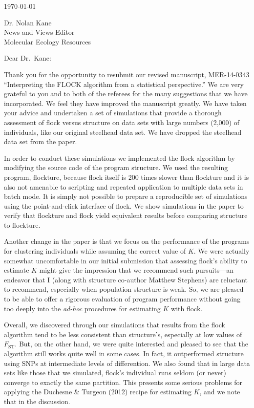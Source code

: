 \documentclass[11pt]{letter}
\date{}
\begin{document}
\begin{letter}{ \today 

Dr. Nolan Kane\\
News and Views Editor\\
Molecular Ecology Resources \\
}

\opening{Dear Dr.~Kane:}

Thank you for the opportunity to resubmit our revised manuscript, MER-14-0343 ``Interpreting the FLOCK algorithm
from a statistical perspective.''  We are very grateful to you and to both of the referees for the many
suggestions that we have incorporated.  We feel they have improved the manuscript greatly.  We have taken your
advice and undertaken a set of simulations that provide a thorough assessment of {\sc flock} versus {\sc 
structure} on data sets with large numbers (2,000) of individuals, like our original steelhead data set.
We have dropped the steelhead data set from the paper.  

In order to conduct these simulations we implemented the {\sc flock} algorithm by modifying the source code of
the program {\sc structure}.  We used the resulting program, {\sc flockture}, because {\sc flock} itself
is 200 times slower than {\sc flockture} and it is also not amenable to scripting and repeated application to 
multiple data sets in batch mode.  It is simply not possible to prepare a reproducible set of simulations using
the point-and-click interface of {\sc flock}.  We show simulations in the paper to verify that {\sc flockture} and {\sc flock} yield equivalent results before comparing {\sc structure} to {\sc flockture}.

Another change in the paper is that we focus on the performance of the programs for clustering individuals while
assuming the correct value of $K$.  We were actually somewhat uncomfortable in our initial submission that
assessing {\sc flock}'s ability to estimate $K$ might give the impression that we recommend such pursuits---an
endeavor that I (along with {\sc structure} co-author Matthew Stephens) are reluctant to recommend, especially
when population structure is weak.  So, we are pleased to be able to offer a rigorous evaluation of program
performance without going too deeply into the {\em ad-hoc} procedures for estimating $K$ with {\sc flock}.

Overall, we discovered through our simulations that results from the {\sc flock} algorithm tend to be less 
consistent than {\sc structure}'s, especially at low values of $F_\mathrm{ST}$.  But, on the other hand, we were 
quite interested and pleased to see that the algorithm still works quite well in some cases.  In fact, it outperformed {\sc structure} 
using SNPs at intermediate levels of differention.  We also found that in large data sets like those that
we simulated, {\sc flock}'s individual runs seldom (or never) converge to exactly the same partition.  This 
presents some serious problems for applying the Duchesne \& Turgeon (2012) recipe for estimating $K$, and we 
note that in the discussion.  


\end{letter}
\end{document}
